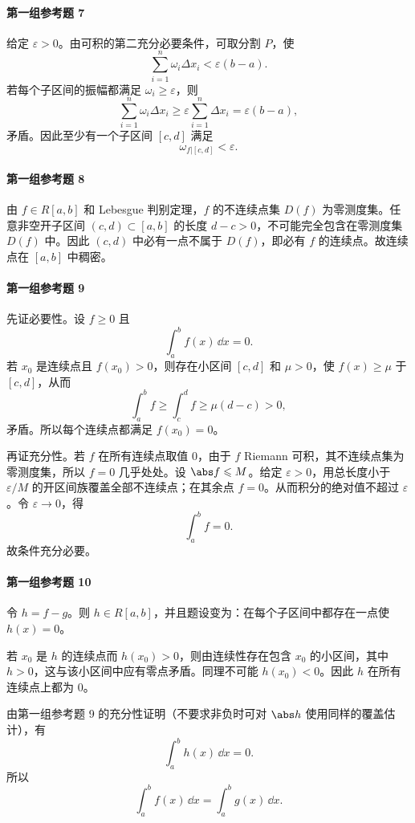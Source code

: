 \paragraph{第一组参考题 7}
\begin{xsolution}
给定 $\varepsilon>0$。由可积的第二充分必要条件，可取分割 $P$，使
\[
  \sum_{i=1}^n\omega_i\Delta x_i<\varepsilon(b-a).
\]
若每个子区间的振幅都满足 $\omega_i\geqslant\varepsilon$，则
\[
  \sum_{i=1}^n\omega_i\Delta x_i
  \geqslant\varepsilon\sum_{i=1}^n\Delta x_i
  =\varepsilon(b-a),
\]
矛盾。因此至少有一个子区间 $[c,d]$ 满足
\[
  \boxed{\omega_{f|[c,d]}<\varepsilon}.
\]
\end{xsolution}

\paragraph{第一组参考题 8}
\begin{xsolution}
由 $f\in R[a,b]$ 和 Lebesgue 判别定理，$f$ 的不连续点集 $D(f)$ 为零测度集。任意非空开子区间 $(c,d)\subset[a,b]$ 的长度 $d-c>0$，不可能完全包含在零测度集 $D(f)$ 中。因此 $(c,d)$ 中必有一点不属于 $D(f)$，即必有 $f$ 的连续点。故连续点在 $[a,b]$ 中稠密。
\end{xsolution}

\paragraph{第一组参考题 9}
\begin{xsolution}
先证必要性。设 $f\geqslant0$ 且
\[
  \int_a^b f(x)\,\dd x=0.
\]
若 $x_0$ 是连续点且 $f(x_0)>0$，则存在小区间 $[c,d]$ 和 $\mu>0$，使 $f(x)\geqslant\mu$ 于 $[c,d]$，从而
\[
  \int_a^b f\geqslant\int_c^d f\geqslant\mu(d-c)>0,
\]
矛盾。所以每个连续点都满足 $f(x_0)=0$。

再证充分性。若 $f$ 在所有连续点取值 $0$，由于 $f$ Riemann 可积，其不连续点集为零测度集，所以 $f=0$ 几乎处处。设 $\abs f\leqslant M$。给定 $\varepsilon>0$，用总长度小于 $\varepsilon/M$ 的开区间族覆盖全部不连续点；在其余点 $f=0$。从而积分的绝对值不超过 $\varepsilon$。令 $\varepsilon\to0$，得
\[
  \int_a^b f=0.
\]
故条件充分必要。
\end{xsolution}

\paragraph{第一组参考题 10}
\begin{xsolution}
令 $h=f-g$。则 $h\in R[a,b]$，并且题设变为：在每个子区间中都存在一点使 $h(x)=0$。

若 $x_0$ 是 $h$ 的连续点而 $h(x_0)>0$，则由连续性存在包含 $x_0$ 的小区间，其中 $h>0$，这与该小区间中应有零点矛盾。同理不可能 $h(x_0)<0$。因此 $h$ 在所有连续点上都为 $0$。

由第一组参考题 9 的充分性证明（不要求非负时可对 $\abs h$ 使用同样的覆盖估计），有
\[
  \int_a^b h(x)\,\dd x=0.
\]
所以
\[
  \boxed{\int_a^b f(x)\,\dd x=\int_a^b g(x)\,\dd x}.
\]
\end{xsolution}

